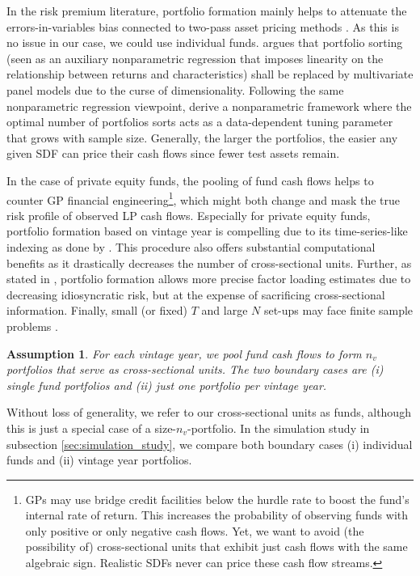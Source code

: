 \documentclass[12pt]{article}
\newtheorem{assume}{Assumption}
\begin{document}
In the risk premium literature, portfolio formation mainly helps to attenuate the errors-in-variables bias connected to two-pass asset pricing methods \citep{JNPR19,PRS19}.
As this is no issue in our case, we could use individual funds.
\cite{C11} argues that portfolio sorting (seen as an auxiliary nonparametric regression that imposes linearity on the relationship between returns and characteristics) shall be replaced by multivariate panel models due to the curse of dimensionality.
Following the same nonparametric regression viewpoint, \cite{CCF19} derive a nonparametric framework where the optimal number of portfolios sorts acts as a data-dependent tuning parameter that grows with sample size.
Generally, the larger the portfolios, the easier any given SDF can price their cash flows since fewer test assets remain.

In the case of private equity funds, the pooling of fund cash flows helps to counter GP financial engineering\footnote{GPs may use bridge credit facilities below the hurdle rate to boost the fund's internal rate of return. This increases the probability of observing funds with only positive or only negative cash flows. Yet, we want to avoid (the possibility of) cross-sectional units that exhibit just cash flows with the same algebraic sign. Realistic SDFs never can price these cash flow streams.}, which might both change and mask the true risk profile of observed LP cash flows.
Especially for private equity funds, portfolio formation based on vintage year is compelling due to its time-series-like indexing as done by \cite{DLP12}.
This procedure also offers substantial computational benefits as it drastically decreases the number of cross-sectional units.
Further, as stated in \cite{ALS20}, portfolio formation allows more precise factor loading estimates  due to decreasing idiosyncratic risk, but at the expense of sacrificing cross-sectional information.
Finally, small (or fixed) $T$ and large $N$ set-ups may face finite sample problems \citep{RRZ20}.

\begin{assume}
	\label{as:portfolio}
	For each vintage year, we pool fund cash flows to form $n_v$ portfolios that serve as cross-sectional units.
	The two boundary cases are (i) single fund portfolios and (ii) just one portfolio per vintage year. 
\end{assume}
Without loss of generality, we refer to our cross-sectional units as funds, although this is just a special case of a size-$n_v$-portfolio.
In the simulation study in subsection \ref{sec:simulation_study}, we compare both boundary cases (i) individual funds and (ii) vintage year portfolios.
\end{document}
